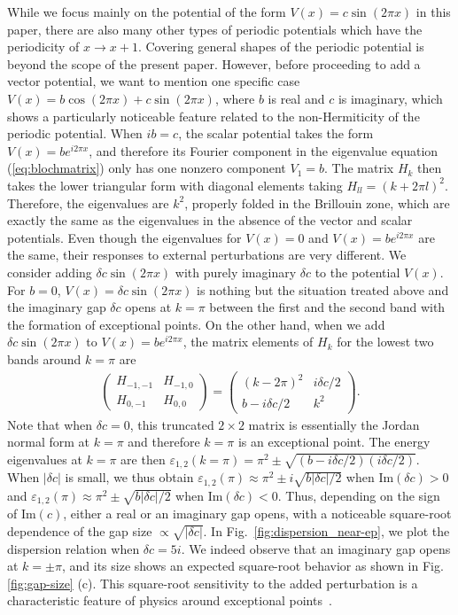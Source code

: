 \documentclass[prb,superscriptaddress,floatfix,twocolumn,showpacs]{revtex4-2}
\begin{document}
While we focus mainly on the potential of the form $V(x) = c\sin(2\pi x)$ in this paper, there are also many other types of periodic potentials which have the periodicity of $x \to x + 1$. 
Covering general shapes of the periodic potential is beyond the scope of the present paper. 
However, before proceeding to add a vector potential, we want to mention one specific case $V(x) = b \cos (2\pi x) + c \sin (2\pi x)$, where $b$ is real and $c$ is imaginary, which shows a particularly noticeable feature related to the non-Hermiticity of the periodic potential. 
When $ib = c$, the scalar potential takes the form $V(x) = b e^{i2\pi x}$, and therefore its Fourier component in the eigenvalue equation (\ref{eq:blochmatrix}) only has one nonzero component $V_1 = b$. 
The matrix $H_k$ then takes the lower triangular form with diagonal elements taking $H_{ll} = (k+2\pi l)^2$. 
Therefore, the eigenvalues are $k^2$, properly folded in the Brillouin zone, which are exactly the same as the eigenvalues in the absence of the vector and scalar potentials. 
Even though the eigenvalues for $V(x) = 0$ and $V(x) = b e^{i2\pi x}$ are the same, their responses to external perturbations are very different. 
We consider adding $\delta c \sin (2\pi x)$ with purely imaginary $\delta c$ to the potential $V(x)$. 
For $b=0$, $V(x)=\delta c \sin (2\pi x)$ is nothing but the situation treated above and the imaginary gap $\delta c$ opens at $k = \pi$ between the first and the second band with the formation of exceptional points. 
On the other hand, when we add $\delta c \sin (2\pi x)$ to $V(x) = b e^{i2\pi x}$, the matrix elements of $H_k$ for the lowest two bands around $k = \pi$ are
\begin{align}
    \begin{pmatrix}
    H_{-1,-1} &
    H_{-1,0} \\
    H_{0,-1} &
    H_{0,0}
    \end{pmatrix}
    =
    \begin{pmatrix}
    (k-2\pi)^2 & i\delta c/2 \\
    b -i\delta c /2 & k^2
    \end{pmatrix}.
\end{align}
Note that when $\delta c = 0$, this truncated $2\times2$ matrix is essentially the Jordan normal form at $k = \pi$ and therefore $k = \pi$ is an exceptional point.
The energy eigenvalues at $k = \pi$ are then $\varepsilon_{1,2}(k=\pi) = \pi^2 \pm \sqrt{(b - i\delta c/2)(i\delta c/2)}$. 
When $|\delta c|$ is small, we thus obtain $\varepsilon_{1,2}(\pi) \approx \pi^2 \pm i\sqrt{b|\delta c|/2}$ when $\mathrm{Im}(\delta c) > 0$ and $\varepsilon_{1,2}(\pi) \approx \pi^2 \pm \sqrt{b|\delta c|/2}$ when $\mathrm{Im}(\delta c) < 0$. Thus, depending on the sign of $\mathrm{Im}(c)$, either a real or an imaginary gap opens, with a noticeable square-root dependence of the gap size $\propto \sqrt{|\delta c|}$. 
In Fig.~\ref{fig:dispersion_near-ep}, we plot the dispersion relation when $\delta c = 5i$. 
We indeed observe that an imaginary gap opens at $k = \pm \pi$, and its size shows an expected square-root behavior as shown in Fig. \ref{fig:gap-size} (c). This square-root sensitivity to the added perturbation is a characteristic feature of physics around exceptional points~\cite{heiss2012physics}.
\end{document}
